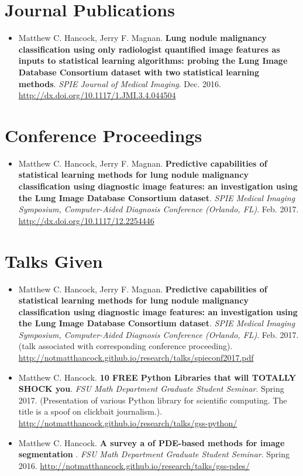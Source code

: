 \documentclass[a4paper,10pt]{report}
\begin{document}
\section{Journal Publications}

\begin{itemize}
    \item Matthew C. Hancock, Jerry F. Magnan. \textbf{Lung nodule malignancy classification using only radiologist quantified image features as inputs to statistical learning algorithms: probing the Lung Image Database Consortium dataset with two statistical learning methods}. \textit{SPIE Journal of Medical Imaging}. Dec. 2016. \url{http://dx.doi.org/10.1117/1.JMI.3.4.044504}\end{itemize}


\section{Conference Proceedings}

\begin{itemize}
    \item Matthew C. Hancock, Jerry F. Magnan. \textbf{Predictive capabilities of statistical learning methods for lung nodule malignancy classification using diagnostic image features: an investigation using the Lung Image Database Consortium dataset}. \textit{SPIE Medical Imaging Symposium, Computer-Aided Diagnosis Conference (Orlando, FL)}. Feb. 2017. \url{http://dx.doi.org/10.1117/12.2254446}\end{itemize}


\section{Talks Given}

\begin{itemize}
    \item Matthew C. Hancock, Jerry F. Magnan. \textbf{Predictive capabilities of statistical learning methods for lung nodule malignancy classification using diagnostic image features: an investigation using the Lung Image Database Consortium dataset}. \textit{SPIE Medical Imaging Symposium, Computer-Aided Diagnosis Conference (Orlando, FL)}. Feb. 2017. (talk associated with corresponding conference proceeding). \url{http://notmatthancock.github.io/research/talks/spieconf2017.pdf}\end{itemize}
\begin{itemize}
    \item Matthew C. Hancock. \textbf{10 FREE Python Libraries that will TOTALLY SHOCK you}. \textit{FSU Math Department Graduate Student Seminar}. Spring 2017. (Presentation of various Python library for scientific computing. The title is a spoof on clickbait journalism.). \url{http://notmatthancock.github.io/research/talks/gss-python/}\end{itemize}
\begin{itemize}
    \item Matthew C. Hancock. \textbf{A survey a of PDE-based methods for image segmentation }. \textit{FSU Math Department Graduate Student Seminar}. Spring 2016. \url{http://notmatthancock.github.io/research/talks/gss-pdes/}\end{itemize}
\end{document}
